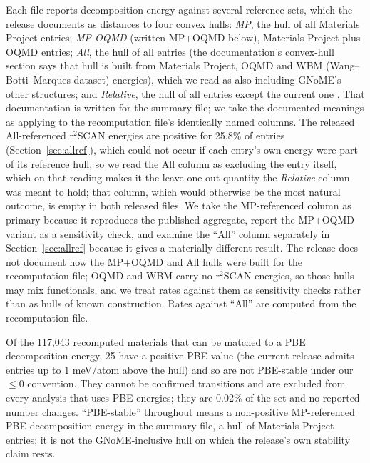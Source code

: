 \documentclass[11pt]{article}
\begin{document}
Each file reports decomposition energy against several reference sets, which the release
documents as distances to four convex hulls: \emph{MP}, the hull of all Materials Project
entries; \emph{MP OQMD} (written MP+OQMD below), Materials Project plus OQMD entries;
\emph{All}, the hull of all entries (the documentation's convex-hull section says that
hull is built from Materials Project, OQMD and WBM (Wang--Botti--Marques dataset) energies),
which we read as also including GNoME's other structures; and \emph{Relative}, the hull of all entries except the current one \citep{gnomedataset}.
That documentation is written for the summary file; we take the documented meanings as
applying to the recomputation file's identically named columns. The released
All-referenced r$^2$SCAN energies are positive for 25.8\% of entries
(Section~\ref{sec:allref}), which could not occur if each entry's own energy were part
of its reference hull, so we read the All column as excluding the entry itself, which on that reading makes
it the leave-one-out quantity the \emph{Relative} column was meant to hold; that column,
which would otherwise be the most natural outcome, is empty in both released files. We take the MP-referenced
column as primary because it reproduces the published aggregate, report the MP+OQMD
variant as a sensitivity check, and examine the ``All'' column separately in
Section~\ref{sec:allref} because it gives a materially different result. The release does not
document how the MP+OQMD and All hulls were built for the recomputation file; OQMD and WBM
carry no r$^2$SCAN energies, so those hulls may mix functionals, and we treat rates against
them as sensitivity checks rather than as hulls of known construction.
Rates against ``All'' are computed from the recomputation file.

Of the 117{,}043 recomputed materials that can be matched to a PBE decomposition energy,
25 have a positive PBE value (the current release admits entries up to 1 meV/atom above
the hull) and so are not PBE-stable under our $\le 0$ convention. They cannot be
confirmed transitions and are excluded from every analysis that uses PBE energies; they are 0.02\% of the set
and no reported number changes. ``PBE-stable'' throughout means a non-positive MP-referenced
PBE decomposition energy in the summary file, a hull of Materials Project entries; it is not
the GNoME-inclusive hull on which the release's own stability claim rests.
\end{document}
